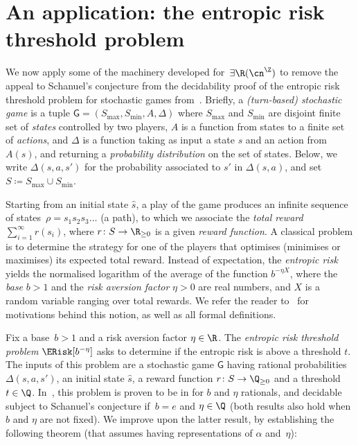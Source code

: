 \section{An application: the entropic risk threshold problem}
\label{sec:application-entropic-risk}

We now apply some of the machinery developed
for~$\exists\R(\ipow{\cn})$ to remove the appeal to Schanuel's conjecture from
the decidability proof of the entropic risk threshold problem
for stochastic games from~\cite{BaierCMP23}.
Briefly, a \emph{(turn-based) stochastic game} is a tuple $\mathsf{G} = (S_{\max},S_{\min},A,\Delta)$ where $S_{\max}$ and $S_{\min}$ are disjoint finite set of \emph{states} controlled by two players, $A$ is a function from states to a finite set of \emph{actions}, 
and $\Delta$ is a function taking as input a state $s$ and an action from $A(s)$, 
and returning a \emph{probability distribution} on the set of states. Below, we write $\Delta(s,a,s')$ for the probability associated to $s'$ in $\Delta(s,a)$, 
and set $S \coloneqq S_{\max} \cup S_{\min}$.

Starting from an initial state $\hat{s}$, a play of the game produces an
infinite sequence of states~$\rho=s_1s_2s_3\dots$ (a path), to which we
associate the \emph{total reward} $\sum_{i=1}^{\infty} r(s_i)$, where $r \colon
S \to \R_{\geq 0}$ is a given \emph{reward function}. 
A classical problem is to determine the strategy for one of the
players that optimises (minimises or maximises) its expected total reward.
Instead of expectation, the \emph{entropic risk} yields the normalised logarithm
of the average of the function $b^{-\eta X}$, where the \emph{base} $b > 1$
and the \emph{risk aversion factor} $\eta > 0$ are real numbers, and $X$ is a
random variable ranging over total rewards. We refer the reader
to~\cite{BaierCMP23} for motivations behind this notion, as well as all formal
definitions.

Fix a base~$b > 1$ and a risk aversion factor $\eta \in \R$.
The \emph{entropic risk threshold problem} $\ERisk[b^{-\eta}]$ asks to
determine if the entropic risk is above a threshold $t$. The inputs of this
problem are a stochastic game $\mathsf{G}$ having rational probabilities~$\Delta(s,a,s')$,
an initial state $\hat{s}$, a reward function $r \colon S \to \Q_{\geq 0}$ and a
threshold $t \in \Q$. In~\cite{BaierCMP23}, this problem is proven to be in \pspace
for $b$ and $\eta$ rationals, and decidable subject to Schanuel's conjecture
if~$b = e$ and $\eta \in \Q$ (both results also hold when $b$ and $\eta$
are not fixed). We improve upon the latter result, by establishing the following
theorem (that assumes having representations of $\alpha$ and~$\eta$):

